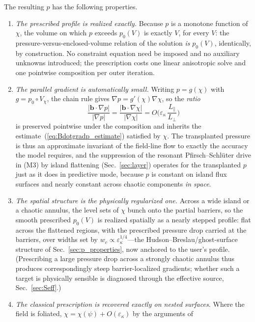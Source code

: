\documentclass[english]{article}
\newcommand{\bb}{\mathbf{b}}
\begin{document}
The resulting $p$ has the following properties.
\begin{enumerate}
\item \emph{The prescribed profile is realized exactly.} Because $p$ is a monotone function of
$\chi$, the volume on which $p$ exceeds $p_0(V)$ is exactly $V$, for every $V$: the
pressure-versus-enclosed-volume relation of the solution \emph{is} $p_0(V)$, identically, by
construction. No constraint equation need be imposed and no auxiliary unknowns introduced; the
prescription costs one linear anisotropic solve and one pointwise composition per outer iteration.
\item \emph{The parallel gradient is automatically small.} Writing $p=g(\chi)$ with
$g=p_0\circ V_\chi$, the chain rule gives $\nabla p=g'(\chi)\nabla\chi$, so the \emph{ratio}
\begin{equation}
\frac{|\bb\cdot\nabla p|}{|\nabla p|}=\frac{|\bb\cdot\nabla\chi|}{|\nabla\chi|}
=O\!\Big(\varepsilon_\kappa\,\frac{L_\parallel}{L_\perp}\Big)
\label{eq:ratio_preserved}
\end{equation}
is preserved pointwise under the composition and inherits the estimate~(\ref{eq:Bdotgradp_estimate})
satisfied by $\chi$. The transplanted pressure is thus an approximate invariant of the field-line
flow to exactly the accuracy the model requires, and the suppression of the resonant
Pfirsch--Schl\"uter drive in (M3) by island flattening (Sec.~\ref{sec:layer}) operates for the
transplanted $p$ just as it does in predictive mode, because $p$ is constant on island flux
surfaces and nearly constant across chaotic components \emph{in space}.
\item \emph{The spatial structure is the physically regularized one.} Across a wide island or a
chaotic annulus, the level sets of $\chi$ bunch onto the partial barriers, so the smooth prescribed
$p_0(V)$ is realized spatially as a nearly stepped profile: flat across the flattened regions, with
the prescribed pressure drop carried at the barriers, over widths set by
$w_c\propto\varepsilon_\kappa^{1/4}$---the Hudson--Breslau/ghost-surface structure of
Sec.~\ref{sec:p_properties}, now anchored to the user's profile. (Prescribing a large pressure
drop across a strongly chaotic annulus thus produces correspondingly steep barrier-localized
gradients; whether such a target is physically sensible is diagnosed through the effective source,
Sec.~\ref{sec:Seff}.)
\item \emph{The classical prescription is recovered exactly on nested surfaces.} Where the field
is foliated, $\chi=\chi(\psi)+O(\varepsilon_\kappa)$ by the arguments of

\end{enumerate}
\end{document}
